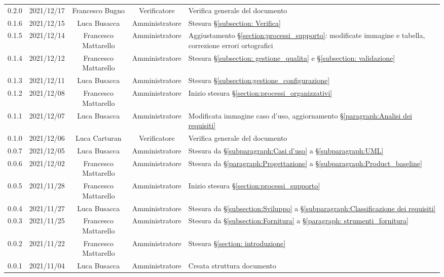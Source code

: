 \begin{center}
\begin{longtable}[c]{c | c | c | c | p{5cm}}
		0.2.0 & 2021/12/17 & Francesco Bugno      & Verificatore   & Verifica generale del documento \\
		0.1.6 & 2021/12/15 & Luca Busacca         & Amministratore & Stesura §\ref{subsection: Verifica} \\
		0.1.5 & 2021/12/14 & Francesco Mattarello & Amministratore & Aggiustamento §\ref{section:processi_supporto}: modificate immagine e tabella, correzione errori ortografici \\
		0.1.4 & 2021/12/12 & Francesco Mattarello & Amministratore & Stesura §\ref{subsection: gestione_qualita} e §\ref{subsection: validazione} \\
		0.1.3 & 2021/12/11 & Luca Busacca         & Amministratore & Stesura  §\ref{subsection:gestione_configurazione} \\
		0.1.2 & 2021/12/08 & Francesco Mattarello & Amministratore & Inizio stesura §\ref{section:processi_organizzativi} \\
		0.1.1 & 2021/12/07 & Luca Busacca         & Amministratore & Modificata immagine caso d'uso, aggiornamento §\ref{paragraph:Analisi dei requisiti} \\
		0.1.0 & 2021/12/06 & Luca Carturan & Verificatore   & Verifica generale del documento \\
		0.0.7 & 2021/12/05 & Luca Busacca         & Amministratore & Stesura da  §\ref{subparagraph:Casi d'uso} a §\ref{subparagraph:UML} \\
		0.0.6 & 2021/12/02 & Francesco Mattarello & Amministratore & Stesura da  §\ref{paragraph:Progettazione} a §\ref{subparagraph:Product_baseline} \\
		0.0.5 & 2021/11/28 & Francesco Mattarello & Amministratore & Inizio stesura §\ref{section:processi_supporto}\\
		0.0.4 & 2021/11/27 & Luca Busacca         & Amministratore & Stesura da §\ref{subsection:Sviluppo} a  §\ref{subparagraph:Classificazione dei requisiti} \\
		0.0.3 & 2021/11/25 & Francesco Mattarello & Amministratore & Stesura da §\ref{subsection:Fornitura} a §\ref{paragraph: strumenti_fornitura} \\
		0.0.2 & 2021/11/22 & Francesco Mattarello & Amministratore & Stesura §\ref{section: introduzione} \\
		0.0.1 & 2021/11/04 & Luca Busacca         & Amministratore & Creata struttura documento \\
	\end{longtable}
\end{center}
